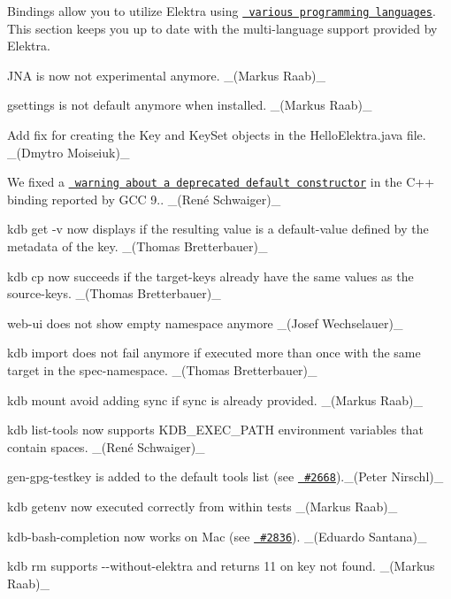 Bindings allow you to utilize Elektra using \href{https://www.libelektra.org/bindings/readme}{\texttt{ various programming languages}}. This section keeps you up to date with the multi-\/language support provided by Elektra.


\begin{DoxyItemize}
\item J\+NA is now not experimental anymore. \+\_\+(\+Markus Raab)\+\_\+
\item gsettings is not default anymore when installed. \+\_\+(\+Markus Raab)\+\_\+
\item Add fix for creating the Key and Key\+Set objects in the Hello\+Elektra.\+java file. \+\_\+(\+Dmytro Moiseiuk)\+\_\+
\item We fixed a \href{https://issues.libelektra.org/2670}{\texttt{ warning about a deprecated default constructor}} in the C++ binding reported by G\+CC 9.. \+\_\+(René Schwaiger)\+\_\+
\end{DoxyItemize}


\begin{DoxyItemize}
\item {\ttfamily kdb get -\/v} now displays if the resulting value is a default-\/value defined by the metadata of the key. \+\_\+(\+Thomas Bretterbauer)\+\_\+
\item {\ttfamily kdb cp} now succeeds if the target-\/keys already have the same values as the source-\/keys. \+\_\+(\+Thomas Bretterbauer)\+\_\+
\item {\ttfamily web-\/ui} does not show empty namespace anymore \+\_\+(\+Josef Wechselauer)\+\_\+
\item {\ttfamily kdb import} does not fail anymore if executed more than once with the same target in the spec-\/namespace. \+\_\+(\+Thomas Bretterbauer)\+\_\+
\item {\ttfamily kdb mount} avoid adding sync if sync is already provided. \+\_\+(\+Markus Raab)\+\_\+
\item {\ttfamily kdb list-\/tools} now supports {\ttfamily K\+D\+B\+\_\+\+E\+X\+E\+C\+\_\+\+P\+A\+TH} environment variables that contain spaces. \+\_\+(René Schwaiger)\+\_\+
\item {\ttfamily gen-\/gpg-\/testkey} is added to the default tools list (see \href{https://github.com/ElektraInitiative/libelektra/issues/2668}{\texttt{ \#2668}}).\+\_\+(\+Peter Nirschl)\+\_\+
\item {\ttfamily kdb getenv} now executed correctly from within tests \+\_\+(\+Markus Raab)\+\_\+
\item {\ttfamily kdb-\/bash-\/completion} now works on Mac (see \href{https://github.com/ElektraInitiative/libelektra/pull/2836}{\texttt{ \#2836}}). \+\_\+(\+Eduardo Santana)\+\_\+
\item {\ttfamily kdb rm} supports {\ttfamily -\/-\/without-\/elektra} and returns 11 on key not found. \+\_\+(\+Markus Raab)\+\_\+
\end{DoxyItemize}


